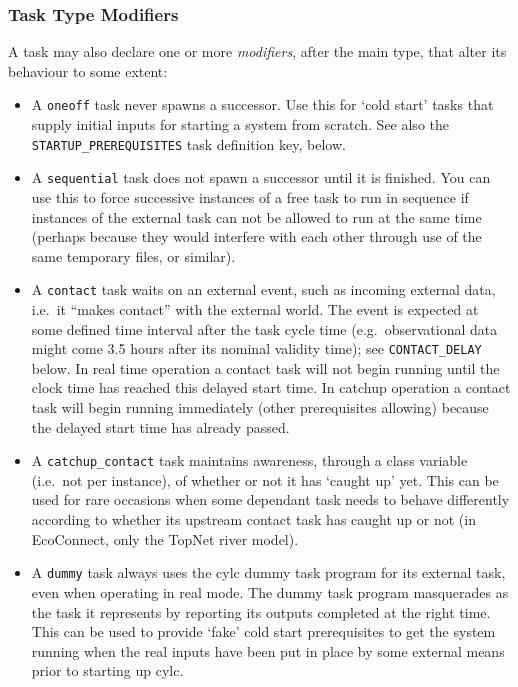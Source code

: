 \documentclass[11pt,a4paper]{article}
\begin{document}
\subsubsection{Task Type Modifiers} 

A task may also declare one or more {\em modifiers}, after the main
type, that alter its behaviour to some extent:

\begin{itemize}
    \item A \lstinline=oneoff= task never spawns a successor. Use this for 
        `cold start' tasks that supply initial inputs for starting a
        system from scratch.  See also the
        \lstinline=STARTUP_PREREQUISITES=
        task definition key, below.

    \item A \lstinline=sequential= task does not spawn a successor until it is
        finished. You can use this to force successive instances of a
        free task to run in sequence if instances of the external task
        can not be allowed to run at the same time (perhaps because they
        would interfere with each other through use of the same
        temporary files, or similar).

    \item A \lstinline=contact= task waits on an external event, such as
        incoming external data, i.e.\ it ``makes contact'' with the
        external world.  The event is expected at some defined time
        interval after the task cycle time (e.g.\ observational data
        might come 3.5 hours after its nominal validity time); see
        \lstinline=CONTACT_DELAY= below. In real time operation a contact task will
        not begin running until the clock time has reached this delayed
        start time. In catchup operation a contact task will begin
        running immediately (other prerequisites allowing) because the
        delayed start time has already passed.  
        
    \item A \lstinline=catchup_contact= task maintains awareness,
        through a class variable (i.e.\ not per instance), of whether or
        not it has `caught up' yet.  This can be used for rare occasions
        when some dependant task needs to behave differently according
        to whether its upstream contact task has caught up or not (in
        EcoConnect, only the TopNet river model).

    \item A \lstinline=dummy= task always uses the cylc dummy task
        program for its external task, even when operating in real mode.
        The dummy task program masquerades as the task it represents by
        reporting its outputs completed at the right time. This can be
        used to provide `fake' cold start prerequisites to get the
        system running when the real inputs have been put in place by
        some external means prior to starting up cylc.

\end{itemize}
\end{document}
